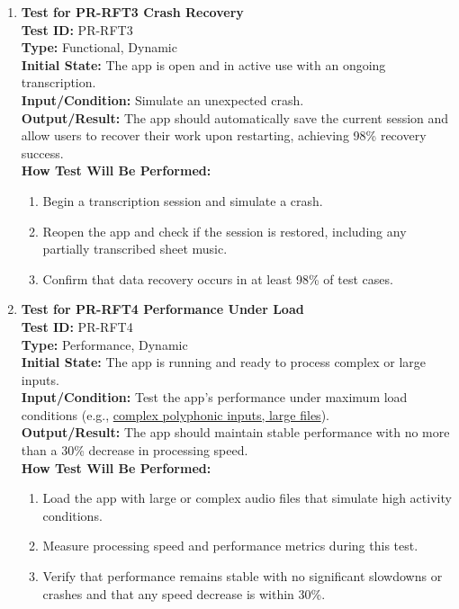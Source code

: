 \documentclass[12pt, titlepage]{article}
\begin{document}
\begin{enumerate}
    \item \textbf{Test for PR-RFT3 Crash Recovery} \\
      \newline
      \textbf{Test ID:} PR-RFT3 \\
      \textbf{Type:} Functional, Dynamic \\
      \textbf{Initial State:} The app is open and in active use with an ongoing transcription. \\
      \textbf{Input/Condition:} Simulate an unexpected crash. \\
      \textbf{Output/Result:} The app should automatically save the current session and allow users to recover their work 
      upon restarting, achieving 98\% recovery success. \\
      \textbf{How Test Will Be Performed:}
      \begin{enumerate}
          \item Begin a transcription session and simulate a crash.
          \item Reopen the app and check if the session is restored, including any partially transcribed sheet music.
          \item Confirm that data recovery occurs in at least 98\% of test cases.
      \end{enumerate}
      \item \textbf{Test for PR-RFT4 Performance Under Load} \\
      \newline
      \textbf{Test ID:} PR-RFT4 \\
      \textbf{Type:} Performance, Dynamic \\
      \textbf{Initial State:} The app is running and ready to process complex or large inputs. \\
      \textbf{Input/Condition:} Test the app’s performance under maximum load conditions (e.g., 
      \href{https://github.com/emilyperica/ScoreGen/tree/main/test/TestingDatasets/piano-samples/sample-chords}{complex polyphonic inputs, large files}). \\
      \textbf{Output/Result:} The app should maintain stable performance with no more than a 30\% decrease in processing speed. \\
      \textbf{How Test Will Be Performed:}
      \begin{enumerate}
          \item Load the app with large or complex audio files that simulate high activity conditions.
          \item Measure processing speed and performance metrics during this test.
          \item Verify that performance remains stable with no significant slowdowns or crashes and that any speed decrease 
          is within 30\%.
      \end{enumerate}


\end{enumerate}
\end{document}
